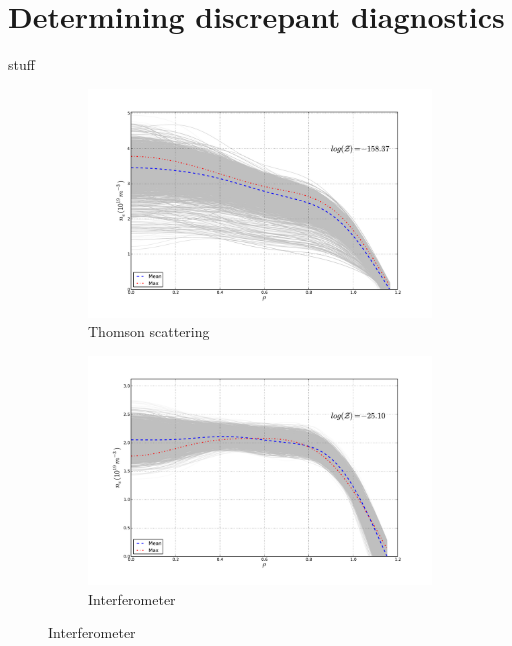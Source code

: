 \documentclass	[12pt]{article}
\begin{document}
\section{Determining discrepant diagnostics}
stuff
\begin{figure}[h!]
	\centering
	\begin{subfigure}[b]{0.5\textwidth}
		\centering
		\includegraphics[width=\textwidth,keepaspectratio=true]{figures/bfit146102_00505_thom5}
		\vspace{-30pt}
		\caption{Thomson scattering}
		\label{fig:ts505}
	\end{subfigure}
	\hspace{-20pt}
	\begin{subfigure}[b]{0.5\textwidth}
		\centering
		\includegraphics[width=\textwidth,keepaspectratio=true]{figures/bfit146102_00505_inter5}
		\vspace{-30pt}
		\caption{Interferometer}

\end{subfigure}
\end{figure}
\end{document}
